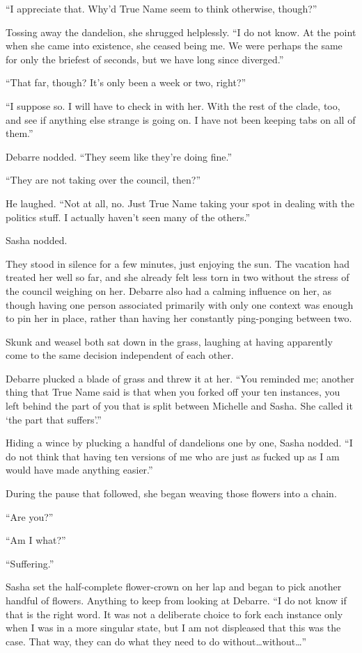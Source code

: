 ``I appreciate that. Why'd True Name seem to think otherwise, though?''

Tossing away the dandelion, she shrugged helplessly. ``I do not know. At the point when she came into existence, she ceased being me. We were perhaps the same for only the briefest of seconds, but we have long since diverged.''

``That far, though? It's only been a week or two, right?''

``I suppose so. I will have to check in with her. With the rest of the clade, too, and see if anything else strange is going on. I have not been keeping tabs on all of them.''

Debarre nodded. ``They seem like they're doing fine.''

``They are not taking over the council, then?''

He laughed. ``Not at all, no. Just True Name taking your spot in dealing with the politics stuff. I actually haven't seen many of the others.''

Sasha nodded.

They stood in silence for a few minutes, just enjoying the sun. The vacation had treated her well so far, and she already felt less torn in two without the stress of the council weighing on her. Debarre also had a calming influence on her, as though having one person associated primarily with only one context was enough to pin her in place, rather than having her constantly ping-ponging between two.

Skunk and weasel both sat down in the grass, laughing at having apparently come to the same decision independent of each other.

Debarre plucked a blade of grass and threw it at her. ``You reminded me; another thing that True Name said is that when you forked off your ten instances, you left behind the part of you that is split between Michelle and Sasha. She called it `the part that suffers'.''

Hiding a wince by plucking a handful of dandelions one by one, Sasha nodded. ``I do not think that having ten versions of me who are just as fucked up as I am would have made anything easier.''

During the pause that followed, she began weaving those flowers into a chain.

``Are you?''

``Am I what?''

``Suffering.''

Sasha set the half-complete flower-crown on her lap and began to pick another handful of flowers. Anything to keep from looking at Debarre. ``I do not know if that is the right word. It was not a deliberate choice to fork each instance only when I was in a more singular state, but I am not displeased that this was the case. That way, they can do what they need to do without\ldots without\ldots{}''

